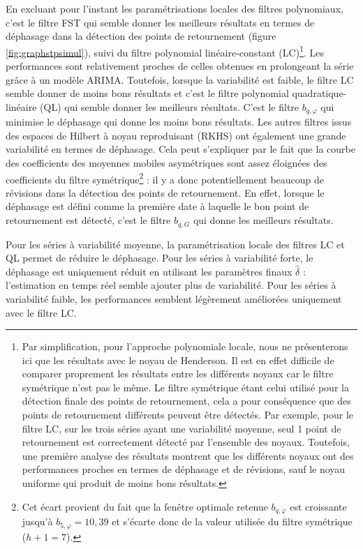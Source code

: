 \documentclass[
  12pt,
  a4paper,french]{article}
\newcommand\1{\mathds{1}}
\begin{document}
En excluant pour l'instant les paramétrisations locales des filtres polynomiaux, c'est le filtre FST qui semble donner les meilleurs résultats en termes de déphasage dans la détection des points de retournement (figure \ref{fig:graphstpsimul}), suivi du filtre polynomial linéaire-constant (LC)\footnote{
  Par simplification, pour l'approche polynomiale locale, nous ne présenterons ici que les résultats avec le noyau de Henderson.
  Il est en effet difficile de comparer proprement les résultats entre les différents noyaux car le filtre symétrique n'est pas le même.
  Le filtre symétrique étant celui utilisé pour la détection finale des points de retournement, cela a pour conséquence que des points de retournement différents peuvent être détectés.
  Par exemple, pour le filtre LC, sur les trois séries ayant une variabilité moyenne, seul 1 point de retournement est correctement détecté par l'ensemble des noyaux.
  Toutefois, une première analyse des résultats montrent que les différents noyaux ont des performances proches en termes de déphasage et de révisions, sauf le noyau uniforme qui produit de moins bons résultats.}.
Les performances sont relativement proches de celles obtenues en prolongeant la série grâce à un modèle ARIMA.
Toutefois, lorsque la variabilité est faible, le filtre LC semble donner de moins bons résultats et c'est le filtre polynomial quadratique-linéaire (QL) qui semble donner les meilleurs résultats.
C'est le filtre \(b_{q,\varphi}\) qui minimise le déphasage qui donne les moins bons résultats.
Les autres filtres issus des espaces de Hilbert à noyau reproduisant (RKHS) ont également une grande variabilité en termes de déphasage.
Cela peut s'expliquer par le fait que la courbe des coefficients des moyennes mobiles asymétriques sont assez éloignées des coefficients du filtre symétrique\footnote{
  Cet écart provient du fait que la fenêtre optimale retenue \(b_{q,\varphi}\) est croissante jusqu'à \(b_{5,\varphi}=10,39\) et s'écarte donc de la valeur utilisée du filtre symétrique (\(h+1=7\)).} : il y a donc potentiellement beaucoup de révisions dans la détection des points de retournement.
En effet, lorsque le déphasage est défini comme la première date à laquelle le bon point de retournement est détecté, c'est le filtre \(b_{q,G}\) qui donne les meilleurs résultats.

Pour les séries à variabilité moyenne, la paramétrisation locale des filtres LC et QL permet de réduire le déphasage.
Pour les séries à variabilité forte, le déphasage est uniquement réduit en utilisant les paramètres finaux \(\hat\delta\) : l'estimation en temps réel semble ajouter plus de variabilité.
Pour les séries à variabilité faible, les performances semblent légèrement améliorées uniquement avec le filtre LC.
\end{document}
